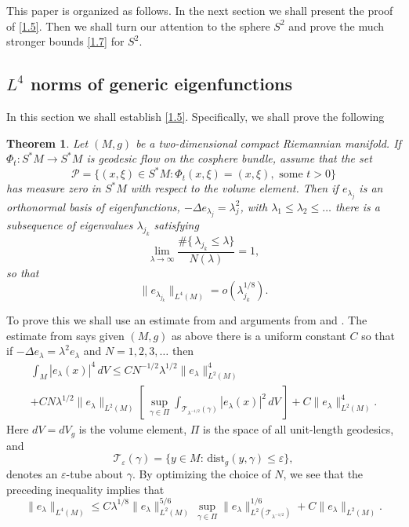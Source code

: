 \documentclass[10pt]{amsart}
\newtheorem{theorem}{Theorem}
\begin{document}
This paper is organized as follows.  In the next section we shall present the
proof of \eqref{1.5}.  Then we shall turn our attention to the
sphere $S^2$ and prove the much stronger bounds \eqref{1.7} for $S^2$.

{\subsection{{$L^4$ norms of generic eigenfunctions}}\setcounter{theorem}{0} \setcounter{equation}{0}
\par\noindent}

In this section we shall establish \eqref{1.5}.  Specifically, we shall prove
the following

\begin{theorem}\label{theorem1.1}
Let $(M,g)$ be a two-dimensional compact Riemannian
manifold.  If $\Phi_t: S^*M\to S^*M$ is geodesic flow on
the cosphere bundle, assume that the set
\begin{equation}\label{2.0}
{\mathcal P}=
\{(x,\xi)\in S^*M: \Phi_t(x,\xi)
=(x,\xi), \, \, \text{some } t>0\}
\end{equation} has measure zero in $S^*M$ with respect to the volume
element.
Then if $e_{\lambda_j}$ is an orthonormal basis of eigenfunctions,
$-\Delta e_{\lambda_j}=\lambda_j^2$, with $\lambda_1\le \lambda_2\le\dots$
there is a subsequence of eigenvalues $\lambda_{j_k}$ satisfying
\begin{equation}\label{2.1}
\lim_{\lambda\to \infty}\frac{\#\{\, \lambda_{j_k}\le \lambda\}}{N(\lambda)}=1,
\end{equation}
so that
\begin{equation}\label{2.2}
\|e_{\lambda_{j_k}}\|_{L^4(M)}=o(\lambda^{1/8}_{j_k}).
\end{equation}

\end{theorem}

To prove this we shall use an estimate from \cite{Sokakeya} and arguments
from \cite{cdv} and \cite{zelditch}.  The estimate from \cite{Sokakeya} says
given $(M,g)$ as above
there is a uniform constant $C$ so
that if $-\Delta e_{\lambda} = {\lambda}^2 e_{\lambda}$ and $N=1,2,3,\dots$ then
\begin{multline*}
\int_M |e_{\lambda} (x)|^4 \, dV
\le CN^{-1/2}{\lambda}^{1/2}\|e_{\lambda}\|^4_{L^2(M)}
\\
+CN{\lambda}^{1/2}\|e_{\lambda}\|_{L^2(M)}\left[ \, \sup_{\gamma\in {\varPi}}
\int_{{\mathcal T}_{{\lambda}^{-1/2}}(\gamma)}|e_{\lambda}(x)|^2\, dV\, \right]
+C\|e_{\lambda}\|_{L^2(M)}^4.
\end{multline*}
Here $dV=dV_g$ is the volume element,  ${\varPi}$ is the space
of all unit-length geodesics, and
$${\mathcal T}_\varepsilon(\gamma)=\{y\in M: \, \text{dist}_g(y, \gamma)\le
{\varepsilon} \},$$
denotes an ${\varepsilon}$-tube about $\gamma$.  By optimizing the choice of $N$,
we see that the preceding inequality implies that
\begin{equation}\label{2.3}
\|e_{\lambda}\|_{L^4(M)}\le C{\lambda}^{1/8}\|e_{\lambda}\|_{L^2(M)}^{5/6}\, \sup_{\gamma\in{\varPi}}
\|e_{\lambda}\|^{1/6}_{L^2({\mathcal T}_{{\lambda}^{-1/2}})} + C\|e_{\lambda}\|_{L^2(M)}.
\end{equation}
\end{document}
